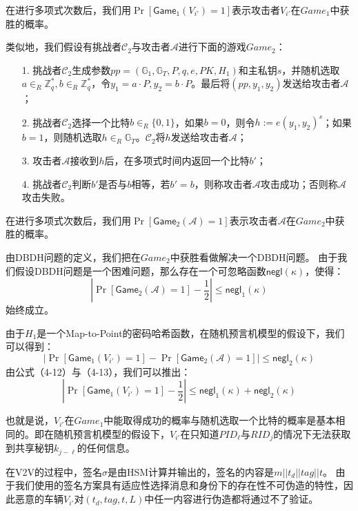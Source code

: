 在进行多项式次数后，我们用$\Pr[\mathsf{Game}_1(V_{i'})=1]$表示攻击者$V_{i'}$在$Game_1$中获胜的概率。

类似地，我们假设有挑战者$\mathcal{C}_2$与攻击者$\mathcal{A}$进行下面的游戏$Game_2$：
\begin{itemize}
  \item[1.] 挑战者$\mathcal{C}_2$生成参数$pp=(\mathbb{G}_1,\mathbb{G}_T,P,q,e,PK,H_1)$和主私钥$s$，并随机选取$a\in_R\mathbb{Z}_q^*,b\in_R\mathbb{Z}_q^*$，令$y_1=a\cdot P,y_2=b\cdot P$。最后将$(pp,y_1,y_2)$发送给攻击者$\mathcal{A}$；
  \item[2.] 挑战者$\mathcal{C}_2$选择一个比特$b\in_R\{0,1\}$，如果$b=0$，则令$h:=e(y_1,y_2)^s$；如果$b=1$，则随机选取$h\in_R\mathbb{G}_T$。$\mathcal{C}_2$将$h$发送给攻击者$\mathcal{A}$；
  \item[3.] 攻击者$\mathcal{A}$接收到$h$后，在多项式时间内返回一个比特$b'$；
  \item[4.] 挑战者$\mathcal{C}_2$判断$b'$是否与$b$相等，若$b'=b$，则称攻击者$\mathcal{A}$攻击成功；否则称$\mathcal{A}$攻击失败。
\end{itemize}

在进行多项式次数后，我们用$\Pr[\mathsf{Game}_2(\mathcal{A})=1]$表示攻击者$\mathcal{A}$在$Game_2$中获胜的概率。

由DBDH问题的定义，我们把在$Game_2$中获胜看做解决一个DBDH问题。
由于我们假设DBDH问题是一个困难问题，那么存在一个可忽略函数$\mathsf{negl}(\kappa)$，使得：
\begin{equation}
|\Pr[\mathsf{Game}_2(\mathcal{A})=1]-\frac{1}{2}|\leq\mathsf{negl}_1(\kappa)
\end{equation}
始终成立。

由于$H_1$是一个Map-to-Point的密码哈希函数，在随机预言机模型的假设下，我们可以得到：
\begin{equation}
|\Pr[\mathsf{Game}_1(V_{i'})=1]-\Pr[\mathsf{Game}_2(\mathcal{A})=1]|\leq \mathsf{negl}_2(\kappa)
\end{equation}
由公式（4-12）与（4-13），我们可以推出：
\begin{equation}
|\Pr[\mathsf{Game}_1(V_{i'})=1]-\frac{1}{2}|\leq \mathsf{negl}_1(\kappa) + \mathsf{negl}_2(\kappa)
\end{equation}

也就是说，$V_{i'}$在$Game_1$中能取得成功的概率与随机选取一个比特的概率是基本相同的。即在随机预言机模型的假设下，$V_{i'}$在只知道$PID_\ell$与$RID_j$的情况下无法获取到共享秘钥$k_{j-\ell}$的任何信息。

在V2V的过程中，签名$\sigma$是由HSM计算并输出的，签名的内容是$m||t_d||tag||t$。
由于我们使用的签名方案具有适应性选择消息和身份下的存在性不可伪造的特性，因此恶意的车辆$V_{i'}$对$(t_d,tag,t,L)$中任一内容进行伪造都将通过不了验证。

